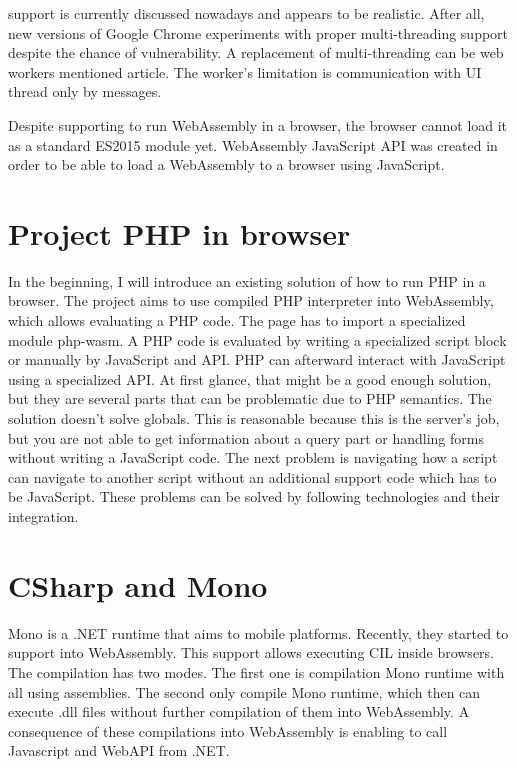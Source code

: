 \cite{Threads} support is currently discussed nowadays and appears to be realistic.
After all, new versions of Google Chrome experiments with proper multi-threading support despite the chance of vulnerability.
A replacement of multi-threading can be web workers mentioned \cite{WebWorkers} article.
The worker's limitation is communication with UI thread only by messages.

Despite supporting to run WebAssembly in a browser, the browser cannot load it as a standard ES2015 module yet.
WebAssembly JavaScript API was created in order to be able to load a WebAssembly to a browser using JavaScript.

\section{Project PHP in browser}

In the beginning, I will introduce an existing solution of how to run PHP in a browser. 
The project \cite{Pib} aims to use compiled PHP interpreter into WebAssembly, which allows evaluating a PHP code.
The page has to import a specialized module php-wasm. 
A PHP code is evaluated by writing a specialized script block or manually by JavaScript and API.
PHP can afterward interact with JavaScript using a specialized API.
At first glance, that might be a good enough solution, but they are several parts that can be problematic due to PHP semantics.
The solution doesn't solve globals. 
This is reasonable because this is the server's job, but you are not able to get information about a query part or handling forms without writing a JavaScript code.
The next problem is navigating how a script can navigate to another script without an additional support code which has to be JavaScript.
These problems can be solved by following technologies and their integration.

\section{CSharp and Mono}

Mono is a .NET runtime that aims to mobile platforms. 
Recently, they started to support \cite{compilation} into WebAssembly.
This support allows executing CIL inside browsers.
The compilation has two modes.
The first one is compilation Mono runtime with all using assemblies.
The second only compile Mono runtime, which then can execute .dll files without further compilation of them into WebAssembly.
A consequence of these compilations into WebAssembly is enabling to call Javascript and WebAPI from .NET.

